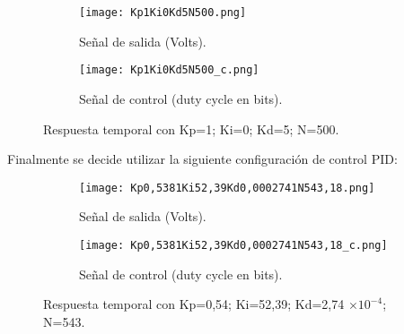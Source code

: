 \begin{figure}[H]
    \centering

    \begin{subfigure}[b]{0.49\textwidth}
        \centering
        \texttt{[image: Kp1Ki0Kd5N500.png]}
        \caption{Señal de salida (Volts).}
        \label{fig:pid_kdalto_salida}
    \end{subfigure}
    \begin{subfigure}[b]{0.49\textwidth}
        \centering
        \texttt{[image: Kp1Ki0Kd5N500\_c.png]}
        \caption{Señal de control (duty cycle en bits).}
        \label{fig:pid_kdalto_control}
    \end{subfigure}

    \vspace{-0.25cm}
    \caption{Respuesta temporal con Kp=1; Ki=0; Kd=5; N=500.\protect \footnotemark}
    \label{fig:pid_kdalto}
\end{figure}
\vspace{-0.5cm}


Finalmente se decide utilizar la siguiente configuración de control PID:

\begin{figure}[H]
    \centering

    \begin{subfigure}[b]{0.49\textwidth}
        \centering
        \texttt{[image: Kp0,5381Ki52,39Kd0,0002741N543,18.png]}
        \caption{Señal de salida (Volts).}
        \label{fig:pid_final_salida}
    \end{subfigure}
    \begin{subfigure}[b]{0.49\textwidth}
        \centering
        \texttt{[image: Kp0,5381Ki52,39Kd0,0002741N543,18\_c.png]}
        \caption{Señal de control (duty cycle en bits).}
        \label{fig:pid_final_control}
    \end{subfigure}

    \vspace{-0.25cm}
    \caption{Respuesta temporal con Kp=0,54; Ki=52,39; Kd=2,74 $\times 10^{-4}$; N=543.}
    \label{fig:pid_final}
\end{figure}
\vspace{-0.5cm}

